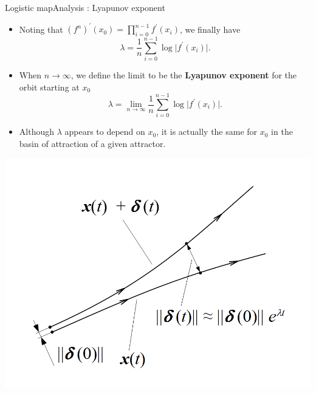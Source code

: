 \documentclass[usenames,dvipsnames,svgnames,10pt,aspectratio=169]{beamer}
\begin{document}
\begin{frame}[t, c]{Logistic map}{Analysis : Lyapunov exponent}
	\begin{minipage}{.58\textwidth}
		\begin{itemize}
			\item Noting that \( \left( f^n \right)^{\prime}(x_0) = \prod_{i=0}^{n-1} f^{\prime}(x_i)\), we finally have
			\[
				\lambda = \frac{1}{n} \sum_{i=0}^{n-1} \log \vert f^{\prime}(x_i) \vert.
			\]

			\item When \(n \to \infty\), we define the limit to be the \textbf{Lyapunov exponent} for the orbit starting at \(x_0\)
			\[
				\lambda = \displaystyle \lim_{n \to \infty} \frac{1}{n} \sum_{i=0}^{n-1} \log \vert f^{\prime}(x_i) \vert.
			\]

			\item Although \( \lambda \) appears to depend on \( x_0 \), it is actually the same for \( x_0 \) in the basin of attraction of a given attractor.
		\end{itemize}
	\end{minipage}%
	\hfill
	\begin{minipage}{.38\textwidth}
		\includegraphics[width=\textwidth]{lyapunov}
	\end{minipage}

	\vspace{1cm}
\end{frame}
\end{document}
